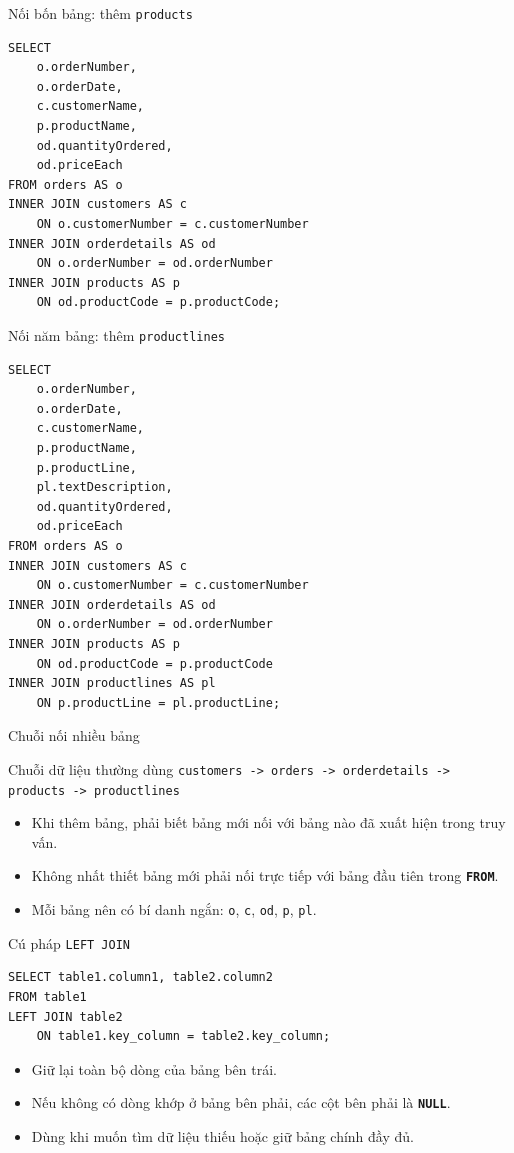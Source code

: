 \documentclass[aspectratio=169,11pt]{beamer}
\newcommand{\kw}[1]{\textbf{\texttt{#1}}}
\begin{document}
\begin{frame}[fragile]{Nối bốn bảng: thêm \texttt{products}}
\begin{lstlisting}
SELECT
    o.orderNumber,
    o.orderDate,
    c.customerName,
    p.productName,
    od.quantityOrdered,
    od.priceEach
FROM orders AS o
INNER JOIN customers AS c
    ON o.customerNumber = c.customerNumber
INNER JOIN orderdetails AS od
    ON o.orderNumber = od.orderNumber
INNER JOIN products AS p
    ON od.productCode = p.productCode;
\end{lstlisting}
\end{frame}

\begin{frame}[fragile]{Nối năm bảng: thêm \texttt{productlines}}
\begin{lstlisting}
SELECT
    o.orderNumber,
    o.orderDate,
    c.customerName,
    p.productName,
    p.productLine,
    pl.textDescription,
    od.quantityOrdered,
    od.priceEach
FROM orders AS o
INNER JOIN customers AS c
    ON o.customerNumber = c.customerNumber
INNER JOIN orderdetails AS od
    ON o.orderNumber = od.orderNumber
INNER JOIN products AS p
    ON od.productCode = p.productCode
INNER JOIN productlines AS pl
    ON p.productLine = pl.productLine;
\end{lstlisting}
\end{frame}

\begin{frame}{Chuỗi nối nhiều bảng}
\begin{block}{Chuỗi dữ liệu thường dùng}
\centering
\texttt{customers -> orders -> orderdetails -> products -> productlines}
\end{block}
\begin{itemize}
  \item Khi thêm bảng, phải biết bảng mới nối với bảng nào đã xuất hiện trong truy vấn.
  \item Không nhất thiết bảng mới phải nối trực tiếp với bảng đầu tiên trong \kw{FROM}.
  \item Mỗi bảng nên có bí danh ngắn: \texttt{o}, \texttt{c}, \texttt{od}, \texttt{p}, \texttt{pl}.
\end{itemize}
\end{frame}

\begin{frame}[fragile]{Cú pháp \texttt{LEFT JOIN}}
\begin{lstlisting}
SELECT table1.column1, table2.column2
FROM table1
LEFT JOIN table2
    ON table1.key_column = table2.key_column;
\end{lstlisting}
\begin{itemize}
  \item Giữ lại toàn bộ dòng của bảng bên trái.
  \item Nếu không có dòng khớp ở bảng bên phải, các cột bên phải là \kw{NULL}.
  \item Dùng khi muốn tìm dữ liệu thiếu hoặc giữ bảng chính đầy đủ.
\end{itemize}
\end{frame}
\end{document}
